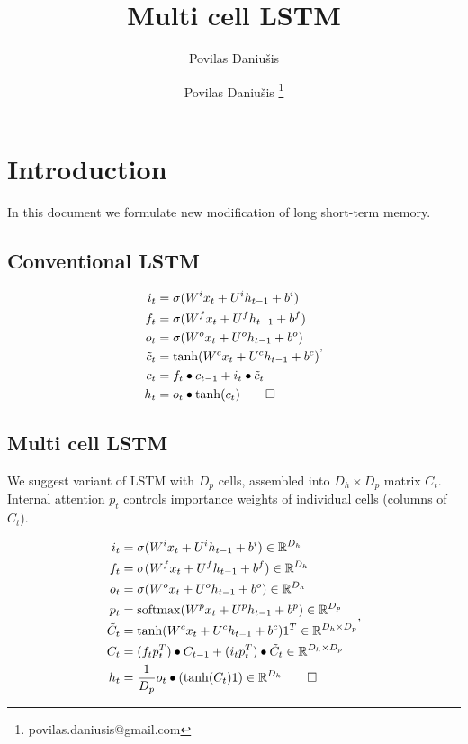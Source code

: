 \documentclass[a4paper,11pt]{article}
\author{Povilas Daniu\v{s}is}
\author[1]{Povilas Daniu\v{s}is \thanks{povilas.daniusis@gmail.com}}
\title{Multi cell LSTM}
\makeatletter
\newcommand{\change@uppercase@math}{%
  \count@=`\A
  \loop
    \mathcode\count@\count@
    \ifnum\count@<`\Z
    \advance\count@\@ne
  \repeat}
\newcommand{\softmax}[1]{
  \mathrm{softmax}(
}
\makeatother
\begin{document}
\maketitle
\section{Introduction}

In this document we formulate new modification of long short-term memory.

\subsection{Conventional LSTM}
\begin{align}
\begin{split}
\label{LSTM}
i_{t} &=\sigma(W^{i}x_{t} + U^{i}h_{t-1} + b^{i})\\
f_{t} &=\sigma(W^{f}x_{t} + U^{f}h_{t-1} + b^{f})\\
o_{t} &=\sigma(W^{o}x_{t} + U^{o}h_{t-1} + b^{o})\\
\tilde{c}_{t} &= \tanh(W^{c}x_{t} + U^{c}h_{t-1} + b^{c})\\
c_{t} &=f_{t} \bullet c_{t-1} + i_{t} \bullet \tilde{c}_{t}\\
h_{t} &=o_{t} \bullet \tanh(c_{t})\qedhere
\end{split},
\end{align}

\subsection{Multi cell LSTM} 

We suggest variant of LSTM with $D_{p}$ cells, assembled into $D_{h} 
\times D_{p}$ matrix $C_{t}$. Internal attention $p_{t}$ controls importance weights of individual cells (columns of $C_{t}$).

\begin{align}
\begin{split}
\label{LSTM}
i_{t} &=\sigma(W^{i}x_{t} + U^{i}h_{t-1} + b^{i}) \in \mathbb{R}^{D_{h}}\\
f_{t} &=\sigma(W^{f}x_{t} + U^{f}h_{t-1} + b^{f})\in \mathbb{R}^{D_{h}}\\
o_{t} &=\sigma(W^{o}x_{t} + U^{o}h_{t-1} + b^{o})\in \mathbb{R}^{D_{h}}\\
p_{t} &=\softmax(W^{p}x_{t} + U^{p}h_{t-1} + b^{p}) \in \mathbb{R}^{D_{p}}\\
\tilde{C}_{t} &= \tanh(W^{c}x_{t} + U^{c}h_{t-1} + b^{c})1^{T}\in \mathbb{R}^{D_{h}
\times D_{p}}\\
C_{t} &=(f_{t} p_{t}^{T}) \bullet C_{t-1} + (i_{t} p_{t}^{T}) \bullet \tilde{C}_{t}\in \mathbb{R}^{D_{h}\times D_{p}} \\
h_{t} &= \frac{1}{D_{p}} o_{t} \bullet (\tanh(C_{t}) 1) \in \mathbb{R}^{D_{h}}\qedhere
\end{split},
\end{align}






\end{document}
